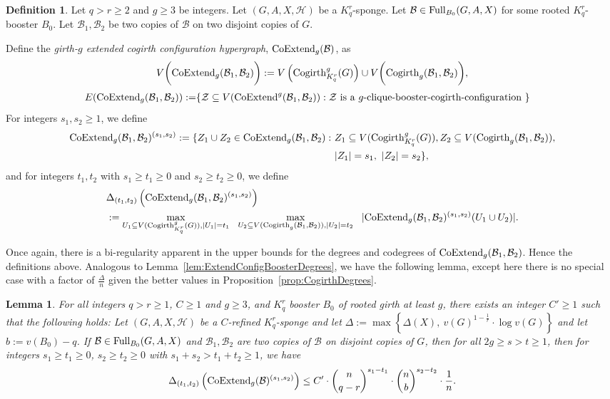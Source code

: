 \documentclass[11pt]{article}
\newcommand{\mc}[1]{\mathcal{#1}}
\newcounter{i}
\theoremstyle{plain}
\newtheorem{lem}[thm]{Lemma}
\theoremstyle{plain} %
\theoremstyle{definition}
\newtheorem{definition}[thm]{Definition}
\begin{document}
\begin{definition}
Let $q>r\ge 2$ and $g\ge 3$ be integers. Let $(G,A,X,\mc{H})$ be a $K_q^r$-sponge. Let $\mc{B} \in {\rm Full}_{B_0}(G,A,X)$ for some rooted $K_q^r$-booster $B_0$. Let $\mc{B}_1,\mc{B}_2$ be two copies of $\mc{B}$ on two disjoint copies of $G$.

Define the \emph{girth-$g$ extended cogirth configuration hypergraph}, ${\rm CoExtend}_g(\mc{B})$, as
$$V\bigg({\rm CoExtend}_g(\mc{B}_1,\mc{B}_2)\bigg) := V\left({\rm Cogirth}^g_{K_q^r}(G)\right)\cup V\bigg({\rm Cogirth}_g(\mc{B}_1,\mc{B}_2)\bigg),$$
\begin{align*}
E({\rm CoExtend}_g(\mc{B}_1,\mc{B}_2)):= &\{ \mc{Z} \subseteq V({\rm CoExtend}^g(\mc{B}_1,\mc{B}_2)): \mc{Z} \text{ is a $g$-clique-booster-cogirth-configuration }\}
\end{align*}
For integers $s_1, s_2\ge 1$, we define 
\begin{align*}
{\rm CoExtend}_g(\mc{B}_1,\mc{B}_2)^{(s_1,s_2)}:= \{Z_1\cup Z_2\in {\rm CoExtend}_g(\mc{B}_1,\mc{B}_2):~&Z_1\subseteq V({\rm Cogirth}^g_{K_q^r}(G)), Z_2\subseteq V({\rm Cogirth}_g(\mc{B}_1,\mc{B}_2)), \\
&|Z_1|=s_1,~|Z_2|=s_2\},    
\end{align*}
and for integers $t_1,t_2$ with $s_1\ge t_1\ge 0$ and $s_2\ge t_2\ge 0$, we define
\begin{align*}
&\Delta_{(t_1,t_2)}\left({\rm CoExtend}_g(\mc{B}_1,\mc{B}_2)^{(s_1,s_2)}\right) \\
&:= \max_{U_1\subseteq V({\rm Cogirth}^g_{K_q^r}(G)), |U_1|=t_1}~~\max_{U_2\subseteq V({\rm Cogirth}_g(\mc{B}_1,\mc{B}_2)), |U_2|=t_2}~~|{\rm CoExtend}_g(\mc{B}_1,\mc{B}_2)^{(s_1,s_2)}(U_1\cup U_2)|.    
\end{align*}
\end{definition}

Once again, there is a bi-regularity apparent in the upper bounds for the degrees and codegrees of ${\rm CoExtend}_g(\mc{B}_1,\mc{B}_2)$. Hence the definitions above. Analogous to Lemma~\ref{lem:ExtendConfigBoosterDegrees}, we have the following lemma, except here there is no special case with a factor of $\frac{\Delta}{n}$ given the better values in Proposition~\ref{prop:CogirthDegrees}.

\begin{lem}\label{lem:CoExtendConfigBoosterDegrees}
For all integers $q>r\ge 1$, $C\ge 1$ and $g\ge 3$, and $K_q^r$ booster $B_0$ of rooted girth at least $g$, there exists an integer $C'\ge 1$ such that the following holds: Let $(G,A,X,\mc{H})$ be a $C$-refined $K_q^r$-sponge and let $\Delta := \max\left\{ \Delta(X),~v(G)^{1-\frac{1}{r}}\cdot \log v(G)\right\}$ and let $b:= v(B_0)-q$. If $\mc{B} \in {\rm Full}_{B_0}(G,A,X)$ and $\mc{B}_1,\mc{B}_2$ are two copies of $\mc{B}$ on disjoint copies of $G$, then for all $2g\ge s > t \ge 1$, then for integers $s_1 \ge t_1 \ge 0$, $s_2\ge t_2\ge 0$ with $s_1+s_2 > t_1+t_2 \ge 1$, we have
$$\Delta_{(t_1,t_2)}\left({\rm CoExtend}_g(\mc{B})^{(s_1,s_2)}\right)\le C'\cdot \binom{n}{q-r}^{s_1-t_1}\cdot \binom{n}{b}^{s_2-t_2}\cdot \frac{1}{n}.$$
\end{lem}
\end{document}
